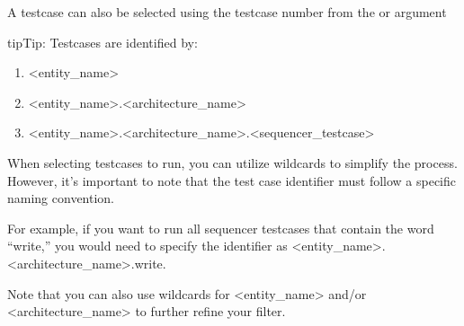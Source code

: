 \documentclass[letterpaper,10pt,english]{sphinxmanual}
\let\sphinxpxdimen\pdfpxdimen\else\newdimen\sphinxpxdimen
\begin{document}
\begin{sphinxVerbatim}[commandchars=\\\{\}]
\end{sphinxVerbatim}

\sphinxAtStartPar
A testcase can also be selected using the testcase number from the  or  argument

\begin{sphinxVerbatim}[commandchars=\\\{\}]
\end{sphinxVerbatim}

\noindent{\hspace*{\fill}\sphinxincludegraphics[width=750\sphinxpxdimen]{{testcase_running}.png}\hspace*{\fill}}

\begin{sphinxadmonition}{tip}{Tip:}
\sphinxAtStartPar
Testcases are identified by:
\begin{enumerate}
%
\item {} 
\sphinxAtStartPar
\textless{}entity\_name\textgreater{}

\item {} 
\sphinxAtStartPar
\textless{}entity\_name\textgreater{}.\textless{}architecture\_name\textgreater{}

\item {} 
\sphinxAtStartPar
\textless{}entity\_name\textgreater{}.\textless{}architecture\_name\textgreater{}.\textless{}sequencer\_testcase\textgreater{}

\end{enumerate}

\begin{DUlineblock}{0em}
\item[] When selecting testcases to run, you can utilize wildcards to simplify the process. However, it’s important to
note that the test case identifier must follow a specific naming convention.
\item[] For example, if you want to run all sequencer testcases that contain the word “write,” you would need to specify
the identifier as \textless{}entity\_name\textgreater{}.\textless{}architecture\_name\textgreater{}.write.
\item[] Note that you can also use wildcards for \textless{}entity\_name\textgreater{} and/or \textless{}architecture\_name\textgreater{} to further
refine your filter.
\end{DUlineblock}
\end{sphinxadmonition}
\end{document}
